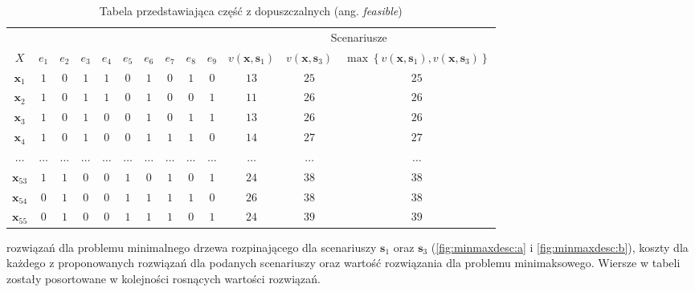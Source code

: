 \begin{table}[!htbp]
	\begin{tabular}{ccccccccccccc}
		\cline{11-13}
		\multicolumn{2}{l}{}       &         &         &         &         &         &         &         &         & \multicolumn{3}{c}{Scenariusze}                                                                                                                                                                                              \\
		$X$              & $e_{1}$ & $e_{2}$ & $e_{3}$ & $e_{4}$ & $e_{5}$ & $e_{6}$ & $e_{7}$ & $e_{8}$ & $e_{9}$ & $v \left( \textbf{x}, \textbf{s}_{1} \right) $ & $ v \left( \textbf{x}, \textbf{s}_{3} \right) $ & $\max \left\{ v \left( \textbf{x}, \textbf{s}_{1} \right), v \left( \textbf{x}, \textbf{s}_{3} \right) \right\} $ \\
		$\textbf{x}_{1}$ & $1$     & $0$     & $1$     & $1$     & $0$     & $1$     & $0$     & $1$	&	$0$	&	$13$	&	$25$	&	$25$	\\
		$\textbf{x}_{2}$ & $1$     & $0$     & $1$     & $1$     & $0$     & $1$     & $0$     & $0$	&	$1$	&	$11$	&	$26$	&	$26$	\\
		$\textbf{x}_{3}$ & $1$     & $0$     & $1$     & $0$     & $0$     & $1$     & $0$     & $1$	&	$1$	&	$13$	&	$26$	&	$26$	\\
		$\textbf{x}_{4}$ & $1$     & $0$     & $1$     & $0$     & $0$     & $1$     & $1$     & $1$	&	$0$	&	$14$	&	$27$	&	$27$	\\
		$\dots$ & $\dots$     & $\dots$     & $\dots$     & $\dots$     & $\dots$     & $\dots$     & $\dots$     & $\dots$	&	$\dots$	&	$\dots$	&	$\dots$	&	$\dots$	\\
		$\textbf{x}_{53}$ & $1$     & $1$     & $0$     & $0$     & $1$     & $0$     & $1$     & $0$	&	$1$	&	$24$	&	$38$	&	$38$	\\
		$\textbf{x}_{54}$ & $0$     & $1$     & $0$     & $0$     & $1$     & $1$     & $1$     & $1$	&	$0$	&	$26$	&	$38$	&	$38$	\\
		$\textbf{x}_{55}$ & $0$     & $1$     & $0$     & $0$     & $1$     & $1$     & $1$     & $0$	&	$1$	&	$24$	&	$39$	&	$39$	\\
		 \hline
	\end{tabular}
	\caption{Tabela przedstawiająca część z dopuszczalnych (ang. \textit{feasible})} rozwiązań dla problemu minimalnego drzewa rozpinającego dla scenariuszy $\textbf{s}_{1}$ oraz $\textbf{s}_{3}$ (\ref{fig:minmaxdesc:a} i \ref{fig:minmaxdesc:b}), koszty dla każdego z proponowanych rozwiązań dla podanych scenariuszy oraz wartość rozwiązania dla problemu minimaksowego. Wiersze w tabeli zostały posortowane w kolejności rosnących wartości rozwiązań.
	\label{tab:minmaxexample}
\end{table}

